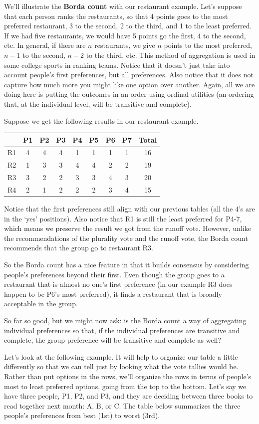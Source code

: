 \documentclass[]{tufte-book}
\begin{document}
We'll illustrate the \textbf{Borda count} with our restaurant example. Let's suppose that each person ranks the restaurants, so that 4 points goes to the most preferred restaurant, 3 to the second, 2 to the third, and 1 to the least preferred. If we had five restaurants, we would have 5 points go the first, 4 to the second, etc. In general, if there are \(n\) restaurants, we give \(n\) points to the most preferred, \(n-1\) to the second, \(n-2\) to the third, etc. This method of aggregation is used in some college sports in ranking teams. Notice that it doesn't just take into account people's first preferences, but all preferences. Also notice that it does not capture how much more you might like one option over another. Again, all we are doing here is putting the outcomes in an order using ordinal utilities (an ordering that, at the individual level, will be transitive and complete).

Suppose we get the following results in our restaurant example.

\begin{longtable}[]{@{}lcccccccc@{}}
\toprule
& P1 & P2 & P3 & P4 & P5 & P6 & P7 & Total\tabularnewline
\midrule
\endhead
R1 & 4 & 4 & 4 & 1 & 1 & 1 & 1 & 16\tabularnewline
R2 & 1 & 3 & 3 & 4 & 4 & 2 & 2 & 19\tabularnewline
R3 & 3 & 2 & 2 & 3 & 3 & 4 & 3 & 20\tabularnewline
R4 & 2 & 1 & 2 & 2 & 2 & 3 & 4 & 15\tabularnewline
\bottomrule
\end{longtable}

Notice that the first preferences still align with our previous tables (all the 4's are in the `yes' positions). Also notice that R1 is still the least preferred for P4-7, which means we preserve the result we got from the runoff vote. However, unlike the recommendations of the plurality vote and the runoff vote, the Borda count recommends that the group go to restaurant R3.

So the Borda count has a nice feature in that it builds consensus by considering people's preferences beyond their first. Even though the group goes to a restaurant that is almost no one's first preference (in our example R3 does happen to be P6's most preferred), it finds a restaurant that is broadly acceptable in the group.

So far so good, but we might now ask: is the Borda count a way of aggregating individual preferences so that, if the individual preferences are transitive and complete, the group preference will be transitive and complete as well?

Let's look at the following example. It will help to organize our table a little differently so that we can tell just by looking what the vote tallies would be. Rather than put options in the rows, we'll organize the rows in terms of people's most to least preferred options, going from the top to the bottom. Let's say we have three people, P1, P2, and P3, and they are deciding between three books to read together next month: A, B, or C. The table below summarizes the three people's preferences from best (1st) to worst (3rd).
\end{document}
